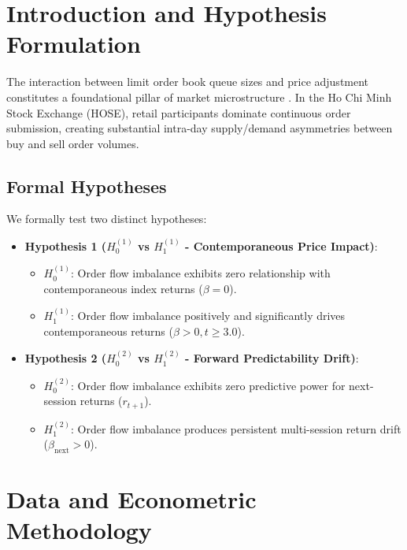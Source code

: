 \documentclass{article}
\begin{document}
\section{Introduction and Hypothesis Formulation}
\label{sec:intro}

The interaction between limit order book queue sizes and price adjustment constitutes a foundational pillar of market microstructure \citep{kyle1985continuous, chordia2002order, cont2014price}. In the Ho Chi Minh Stock Exchange (HOSE), retail participants dominate continuous order submission, creating substantial intra-day supply/demand asymmetries between buy and sell order volumes.

\subsection{Formal Hypotheses}
We formally test two distinct hypotheses:
\begin{itemize}
    \item \textbf{Hypothesis 1 ($H_0^{(1)}$ vs $H_1^{(1)}$ - Contemporaneous Price Impact)}:
    \begin{itemize}
        \item $H_0^{(1)}$: Order flow imbalance exhibits zero relationship with contemporaneous index returns ($\beta = 0$).
        \item $H_1^{(1)}$: Order flow imbalance positively and significantly drives contemporaneous returns ($\beta > 0, t \ge 3.0$).
    \end{itemize}
    \item \textbf{Hypothesis 2 ($H_0^{(2)}$ vs $H_1^{(2)}$ - Forward Predictability Drift)}:
    \begin{itemize}
        \item $H_0^{(2)}$: Order flow imbalance exhibits zero predictive power for next-session returns ($r_{t+1}$).
        \item $H_1^{(2)}$: Order flow imbalance produces persistent multi-session return drift ($\beta_{\text{next}} > 0$).
    \end{itemize}
\end{itemize}

\section{Data and Econometric Methodology}
\label{sec:data}
\end{document}

